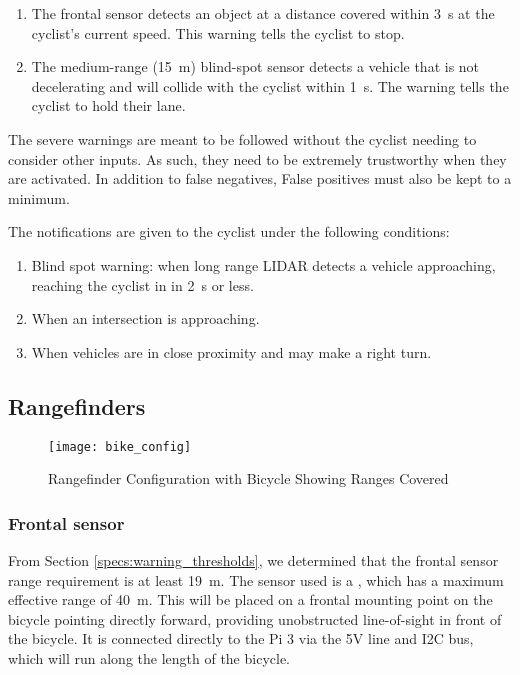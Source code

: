 \documentclass[journal]{IEEEtran}
\begin{document}
\begin{enumerate}
    \item The frontal sensor detects an object at a distance covered within \SI{3}{\s} at the cyclist's current speed. This warning tells the cyclist to stop.
    \item The medium-range (\SI{15}{\meter}) blind-spot sensor detects a vehicle that is not decelerating and will collide with the cyclist within \SI{1}{\s}. The warning tells the cyclist to hold their lane.
\end{enumerate}

The severe warnings are meant to be followed without the cyclist needing to consider other inputs. As such, they need to be extremely trustworthy when they are activated. In addition to false negatives, False positives must also be kept to a minimum.

The notifications are given to the cyclist under the following conditions:

\begin{enumerate}
    \item Blind spot warning: when long range LIDAR detects a vehicle approaching, reaching the cyclist in in \SI{2}{\s} or less.
    \item When an intersection is approaching.
    \item When vehicles are in close proximity and may make a right turn.
\end{enumerate}

\subsection{Rangefinders}
\begin{figure*}
    \centering
    \texttt{[image: bike\_config]}
    \caption{Rangefinder Configuration with Bicycle Showing Ranges Covered}
    \label{fig:bike_config}
\end{figure*}
\subsubsection{Frontal sensor}
From Section \ref{specs:warning_thresholds}, we determined that the frontal sensor range requirement is at least \SI{19}{\meter}. The sensor used is a \lidar{}, which has a maximum effective range of \SI{40}{\meter}. This will be placed on a frontal mounting point on the bicycle pointing directly forward, providing unobstructed line-of-sight in front of the bicycle. It is connected directly to the Pi 3 via the 5V line and I2C bus, which will run along the length of the bicycle.
\end{document}
